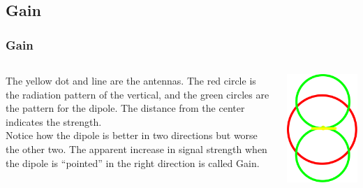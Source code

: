 \documentclass[10pt]{beamer}
\begin{document}
\subsection{Gain}
\begin{frame}
\frametitle{Gain}
\begin{columns}
\begin{column}{.5\textwidth}
The yellow dot and line are the antennas. The red circle is the radiation pattern of the vertical, and the green circles are the pattern for the dipole. The distance from the center indicates the strength.\\
Notice how the dipole is better in two directions but worse the other two. The apparent increase in signal strength when the dipole is ``pointed'' in the right direction is called Gain.
\end{column}
\begin{column}{.5\textwidth}
\includegraphics[width=\textwidth]{vertvsdipole.png}
\end{column}
\end{columns}
\end{frame}
\end{document}
